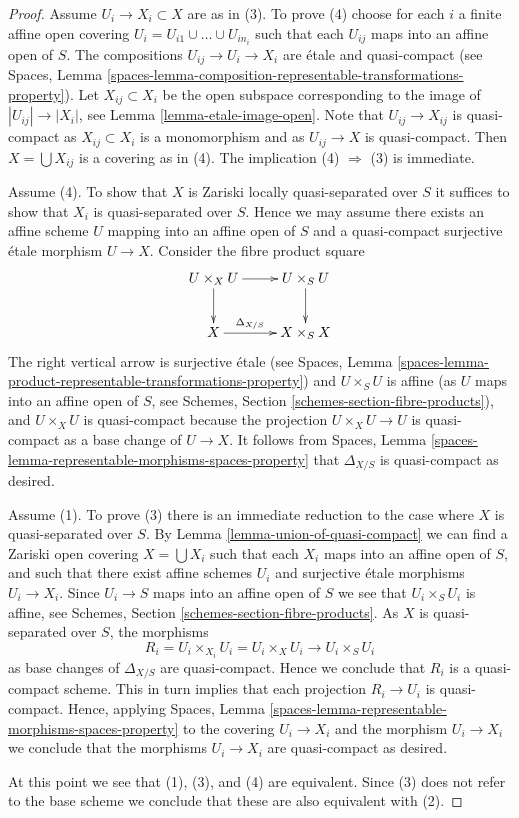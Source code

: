 \documentclass[10pt,a4paper]{amsart}
\theoremstyle{plain}
\theoremstyle{definition}
\theoremstyle{remark}
\numberwithin{equation}{subsection}
\begin{document}
\begin{proof}
Assume  $U_i \to X_i \subset X$ are as in (3). To prove (4)
choose for each $i$ a finite affine open covering $U_i =
U_{i1} \cup \ldots \cup U_{in_i}$ such that each $U_{ij}$ maps
into an affine open of $S$. The compositions
$U_{ij} \to U_i \to X_i$ are \'etale and quasi-compact (see
Spaces, Lemma
\ref{spaces-lemma-composition-representable-transformations-property}).
Let $X_{ij} \subset X_i$ be the open subspace corresponding to
the image of $|U_{ij}| \to |X_i|$, see
Lemma \ref{lemma-etale-image-open}.
Note that $U_{ij} \to X_{ij}$ is quasi-compact as $X_{ij} \subset X_i$
is a monomorphism and as $U_{ij} \to X$ is quasi-compact.
Then $X = \bigcup X_{ij}$ is a covering as in (4).
The implication (4) $\Rightarrow$ (3) is immediate.

\medskip\noindent
Assume (4). To show that $X$ is Zariski locally quasi-separated over $S$
it suffices to show that $X_i$ is quasi-separated over $S$.
Hence we may assume there exists an affine scheme $U$ mapping into
an affine open of $S$ and a quasi-compact surjective \'etale
morphism $U \to X$. Consider the fibre product square
$$
\xymatrix{
U \times_X U \ar[r] \ar[d] & U \times_S U \ar[d] \\
X \ar[r]^-{\Delta_{X/S}} & X \times_S X
}
$$
The right vertical arrow is surjective \'etale (see
Spaces, Lemma
\ref{spaces-lemma-product-representable-transformations-property})
and $U \times_S U$ is affine (as $U$ maps into an affine open of $S$, see
Schemes, Section \ref{schemes-section-fibre-products}),
and $U \times_X U$ is quasi-compact
because the projection $U \times_X U \to U$ is quasi-compact as a
base change of $U \to X$. It follows from
Spaces, Lemma \ref{spaces-lemma-representable-morphisms-spaces-property}
that $\Delta_{X/S}$ is quasi-compact as desired.

\medskip\noindent
Assume (1). To prove (3) there is an immediate reduction to the case
where $X$ is quasi-separated over $S$. By
Lemma \ref{lemma-union-of-quasi-compact}
we can find a Zariski open covering $X = \bigcup X_i$ such that each
$X_i$ maps into an affine open of $S$, and such that there exist affine
schemes $U_i$ and surjective \'etale morphisms $U_i \to X_i$.
Since $U_i \to S$ maps into an affine open of $S$ we see that
$U_i \times_S U_i$ is affine, see
Schemes, Section \ref{schemes-section-fibre-products}.
As $X$ is quasi-separated over $S$, the morphisms
$$
R_i = U_i \times_{X_i} U_i = U_i \times_X U_i
\longrightarrow
U_i \times_S U_i
$$
as base changes of $\Delta_{X/S}$ are quasi-compact. Hence we conclude
that $R_i$ is a quasi-compact scheme. This in turn implies that each
projection $R_i \to U_i$ is quasi-compact. Hence, applying
Spaces, Lemma \ref{spaces-lemma-representable-morphisms-spaces-property}
to the covering $U_i \to X_i$ and the morphism $U_i \to X_i$
we conclude that the morphisms $U_i \to X_i$ are quasi-compact as desired.

\medskip\noindent
At this point we see that (1), (3), and (4) are equivalent. Since (3) does
not refer to the base scheme we conclude that these are also equivalent
with (2).
\end{proof}
\end{document}
